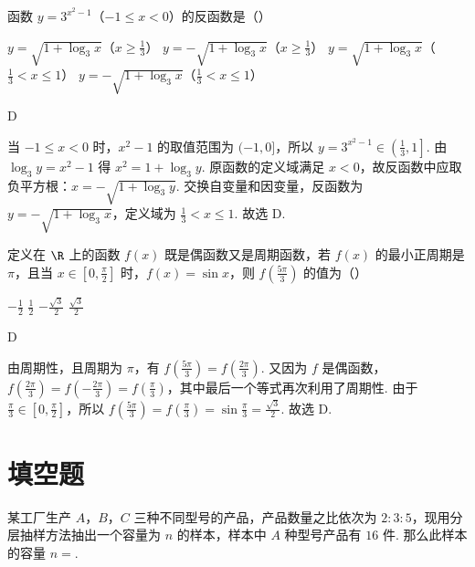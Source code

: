 \begin{problem}
函数 \(y = 3^{x^2 - 1}\)（\(-1 \leqslant x < 0\)）的反函数是（\quad）

\choices
    {\(y = \sqrt{1 + \log_3 x}\)（\(x \geqslant \frac{1}{3}\)）}
    {\(y = -\sqrt{1 + \log_3 x}\)（\(x \geqslant \frac{1}{3}\)）}
    {\(y = \sqrt{1 + \log_3 x}\)（\(\frac{1}{3} < x \leqslant 1\)）}
    {\(y = -\sqrt{1 + \log_3 x}\)（\(\frac{1}{3} < x \leqslant 1\)）}
\end{problem}

\begin{answer}
D
\end{answer}

\begin{solution}
当 \(-1\leqslant x<0\) 时，\(x^2-1\) 的取值范围为 \((-1,0]\)，所以
\(y=3^{x^2-1}\in\left(\frac13,1\right]\). 由 \(\log_3y=x^2-1\) 得 \(x^2=1+\log_3y\). 原函数的定义域满足 \(x<0\)，故反函数中应取负平方根：\(x=-\sqrt{1+\log_3y}\). 交换自变量和因变量，反函数为 \(y=-\sqrt{1+\log_3x}\)，定义域为 \(\frac13<x\leqslant1\).
故选 D.
\end{solution}

\begin{problem}
定义在 \(\R\) 上的函数 \(f(x)\) 既是偶函数又是周期函数，若 \(f(x)\) 的最小正周期是 \(\pi\)，且当 \(x \in \left[0, \frac{\pi}{2}\right]\) 时，\(f(x) = \sin x\)，则 \(f\left(\frac{5\pi}{3}\right)\) 的值为（\quad）

\choices
    {\(-\frac{1}{2}\)}
    {\(\frac{1}{2}\)}
    {\(-\frac{\sqrt{3}}{2}\)}
    {\(\frac{\sqrt{3}}{2}\)}
\end{problem}

\begin{answer}
D
\end{answer}

\begin{solution}
由周期性，且周期为 \(\pi\)，有 \(f\left(\frac{5\pi}{3}\right)=f\left(\frac{2\pi}{3}\right)\). 又因为 \(f\) 是偶函数，\(f\left(\frac{2\pi}{3}\right)=f\left(-\frac{2\pi}{3}\right)=f\left(\frac{\pi}{3}\right)\)，其中最后一个等式再次利用了周期性. 由于 \(\frac{\pi}{3}\in[0,\frac{\pi}{2}]\)，所以 \(f\left(\frac{5\pi}{3}\right)=f\left(\frac{\pi}{3}\right)=\sin\frac{\pi}{3}=\frac{\sqrt3}{2}\).
故选 D.
\end{solution}

\section{填空题}
\begin{problem}
某工厂生产 \(A\)，\(B\)，\(C\) 三种不同型号的产品，产品数量之比依次为 \(2:3:5\)，现用分层抽样方法抽出一个容量为 \(n\) 的样本，样本中 \(A\) 种型号产品有 \(16\) 件. 那么此样本的容量 \(n =\)\fillinblank{}.
\end{problem}

